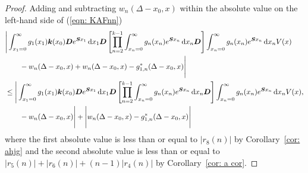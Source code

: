 \begin{proof}
	Adding and subtracting \(w_n(\Delta-x_0,x)\) within the absolute value on the left-hand side of (\ref{eqn: KAFnn}) 
	\begin{align*}
		&\Bigg| \int_{x_1=0}^\infty g_1(x_1) \boldsymbol k(x_0) \boldsymbol D e^{\boldsymbol{S}x_1}\, \mathrm{d} x_1\boldsymbol D 
            	\left[\prod_{n=2}^{k-1}\int_{x_n=0}^\infty g_n(x_n) e^{\boldsymbol{S}x_n} \, \mathrm{d} x_n
		\boldsymbol D\right]
            	\int_{x_n=0}^\infty g_{n}(x_n) e^{\boldsymbol{S}x_n} \, \mathrm{d} x_n V(x) \nonumber 
		\\\nonumber &{}\qquad - w_n(\Delta - x_0,x) + w_n(\Delta - x_0,x) - g_{1,n}^*(\Delta - x_0,x) \Bigg| 
		\\&\leq \Bigg| \int_{x_1=0}^\infty g_1(x_1) \boldsymbol k(x_0) \boldsymbol D e^{\boldsymbol{S}x_1}\, \mathrm{d} x_1\boldsymbol D 
            	\left[\prod_{n=2}^{k-1}\int_{x_n=0}^\infty g_n(x_n) e^{\boldsymbol{S}x_n} \, \mathrm{d} x_n
		\boldsymbol D\right]
            	\int_{x_n=0}^\infty g_{n}(x_n) e^{\boldsymbol{S}x_n} \, \mathrm{d} x_n V(x) ,\nonumber 
	\\&\qquad - w_n(\Delta - x_0,x)\Bigg| + \Bigg| w_n(\Delta - x_0,x) - g_{1,n}^*(\Delta - x_0,x) \Bigg| 
	\end{align*}
	where the first absolute value is less than or equal to \(|r_8(n)|\) by Corollary~\ref{cor: ahjg} and the second absolute value is less than or equal to \(|r_5(n)|+|r_6(n)| + (n-1)|r_4(n)|\) by Corollary~\ref{cor: a cor}.
\end{proof}

